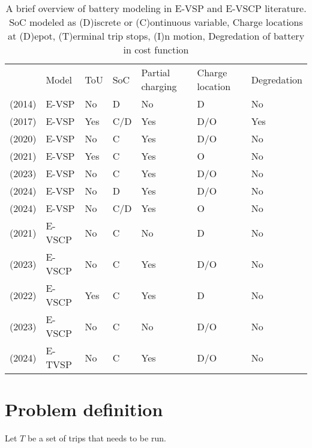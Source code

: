 \documentclass[ht]{article}
\begin{document}
\begin{table}[h]
  \centering
  \begin{tabular}{cllllll}
      \toprule
      & Model & ToU & SoC & Partial charging & Charge location & Degredation \\
      \cmidrule(lr){2-7}
      \cite{Li2014} (2014) & E-VSP & No & D & No & D & No \\
      \cite{vanKootenNiekerk2017} (2017) & E-VSP & Yes & C/D & Yes & D/O & Yes \\
      \cite{Olsen2020} (2020) & E-VSP & No & C & Yes & D/O & No \\ 
      \cite{Jiang2021} (2021) & E-VSP & Yes & C & Yes & O & No \\ 
      \cite{Parmentier2023} (2023) & E-VSP & No & C & Yes & D/O & No \\
      \cite{deVos2024} (2024) & E-VSP & No & D & Yes & D/O & No \\ 
      \cite{Pulyassary2024} (2024) & E-VSP & No & C/D & Yes & O & No \\
      \addlinespace[0.4em]
      \cite{Perumal2021} (2021) & E-VSCP & No & C & No & D & No  \\
      \cite{Sistig2023} (2023) & E-VSCP & No & C & Yes & D/O & No \\
      \cite{Wang2022} (2022) & E-VSCP & Yes & C & Yes & D & No \\
      \cite{Shen2023} (2023) & E-VSCP & No & C & No & D/O & No \\
      \addlinespace[0.4em]
      \cite{Stadnichuk2024} (2024) & E-TVSP & No & C & Yes & D/O & No \\
      \bottomrule
  \end{tabular}
  \caption{A brief overview of battery modeling in E-VSP and E-VSCP literature. SoC modeled as (D)iscrete or (C)ontinuous variable, Charge locations at (D)epot, (T)erminal trip stops, (I)n motion, Degredation of battery in cost function}
  \label{tab:evscp-lit}
\end{table}

\section{Problem definition}
\label{sec:problem_def}
Let $T$ be a set of trips that needs to be run. 
\printbibliography
\end{document}

